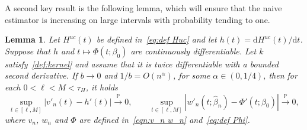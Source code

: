 \documentclass[11pt,reqno]{amsart}
\theoremstyle{definition}
\theoremstyle{plain}
\newtheorem{lemma}[de]{Lemma}
\theoremstyle{remark}
\begin{document}
A second key result is the following lemma, which will ensure that the naive estimator is increasing on large intervals
with probability tending to one.
\begin{lemma}
\label{le:1a}
Let $H^{uc}(t)$ be defined in~\eqref{eq:def Huc} and let $h(t)=\mathrm{d}H^{uc}(t)/\mathrm{d}t$.
Suppose that $h$ and $t\mapsto\Phi(t;\beta_0)$ are continuously differentiable.
Let $k$ satisfy~\eqref{def:kernel} and assume that it is twice differentiable with a bounded second derivative.
If $b\to0$ and $1/b=O(n^{\alpha})$, for some $\alpha\in(0,1/4)$, then
for each $0<\ell<M<\tau_H$, it holds
\begin{equation}
\label{eqn:lemma1-2}
\sup_{t\in[\ell,M]}|v'_n(t)-h'(t)|\xrightarrow{\mathbb{P}}0,
\qquad
\sup_{t\in[\ell,M]}|w'_n(t;\hat{\beta}_n)-\Phi'(t;\beta_0)|\xrightarrow{\mathbb{P}}0,
\end{equation}
where $v_n$, $w_n$ and $\Phi$ are defined in~\eqref{eqn:v_n w_n} and~\eqref{eq:def Phi}.
\end{lemma}
\end{document}
